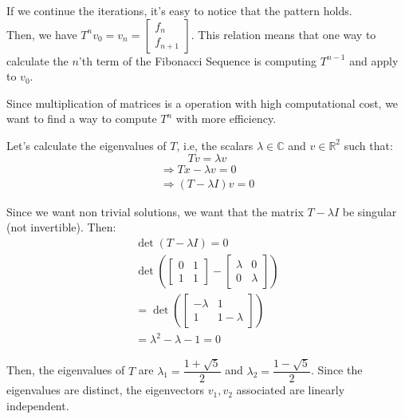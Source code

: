 \documentclass{article}
\begin{document}
If we continue the iterations, it's easy to notice that the pattern holds.\\
Then, we have $T^n v_0 = v_n = \begin{bmatrix}
    f_n\\
    f_{n + 1}
\end{bmatrix}$. This relation means that one way to calculate the $n$'th term
of the Fibonacci Sequence is computing $T^{n - 1}$ and apply to $v_0$.

Since multiplication of matrices is a operation with high computational cost,
we want to find a way to compute $T^n$ with more efficiency.

Let's calculate the eigenvalues of $T$, i.e, the scalars
$\lambda \in \mathbb{C}$ and $v \in \mathbb{R}^2$ such that:
    \begin{equation}
        Tv = \lambda v
    \end{equation}
\begin{equation*}
    \begin{aligned}
        \Rightarrow Tx - \lambda v = 0\\
        \Rightarrow (T - \lambda I)v = 0
    \end{aligned}
\end{equation*}


Since we want non trivial solutions, we want that the matrix $T - \lambda I$ be
singular (not invertible). Then:
\begin{equation*}
    \begin{aligned}
    \det(T - \lambda I) = 0\\
    \det(\begin{bmatrix}
        0 & 1 \\
        1 & 1
    \end{bmatrix} - \begin{bmatrix}
        \lambda & 0\\
        0 & \lambda
    \end{bmatrix})\\
    =\det(\begin{bmatrix}
        -\lambda & 1\\
        1 & 1 - \lambda
    \end{bmatrix})\\
    = \lambda^2 - \lambda - 1 = 0
    \end{aligned}
\end{equation*}

Then, the eigenvalues of $T$ are $\lambda_1 = \dfrac{1 + \sqrt{5}}{2}$ and
$\lambda_2 = \dfrac{1 - \sqrt{5}}{2}$. Since the eigenvalues are distinct, the
eigenvectors $v_1, v_2$ associated are linearly independent.
\end{document}

